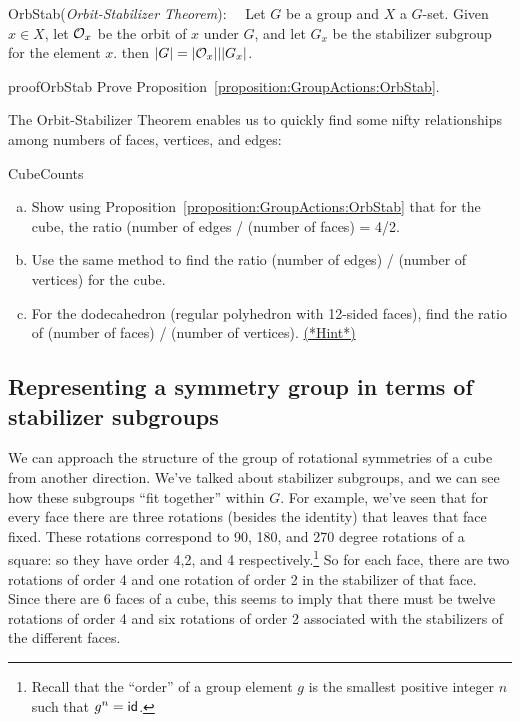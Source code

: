 \begin{prop}{OrbStab}(\emph{Orbit-Stabilizer Theorem}):~~
Let $G$ be a group and $X$ a $G$-set. Given $x\in X$, let ${\cal O}_x$ be the orbit of $x$ under $G$, and let $G_x$ be the stabilizer subgroup for the element $x$. then $|G| = |{\cal O}_x|||G_x|$. 
\end{prop}

\begin{exercise}{proofOrbStab}
Prove Proposition~\ref{proposition:GroupActions:OrbStab}.
\end{exercise}


The Orbit-Stabilizer Theorem enables us to quickly find some nifty relationships among numbers of faces, vertices, and edges:

\begin{exercise}{CubeCounts}
\begin{enumerate}[(a)]
\item
Show using Proposition~\ref{proposition:GroupActions:OrbStab} that for the cube, the ratio (number of edges / (number of  faces) = 4/2. 
\item Use the same method to find the ratio (number of edges) / (number of vertices) for the cube.
\item For the dodecahedron (regular polyhedron with 12-sided faces), find the ratio of (number of faces) / (number of vertices).
\hyperref[sec:GroupActions:Hints]{(*Hint*)}
\end{enumerate}
\end{exercise} 

\subsection{Representing a symmetry group in terms of stabilizer subgroups}
\label{subsec:GroupActions:SymmetryOfPolyhedra:RepresentSymmetryGroupAsStabilizer}

We can approach the structure of the group of rotational symmetries of a cube from another direction.  We've talked about stabilizer subgroups, and we can see how these subgroups ``fit together'' within $G$.
For example, we've seen that for every face there are three rotations (besides the identity) that leaves that face fixed. These rotations correspond to 90, 180, and 270 degree rotations of a square: so they have order 4,2, and 4 respectively.\footnote{Recall that the ``order'' of a group element $g$ is the smallest positive integer $n$ such that $g^n = \sf{id}$.} So for each face, there are two rotations of order 4 and one rotation of order 2 in the stabilizer of that face. Since there are 6 faces of a cube, this seems to imply that there must be twelve rotations of order 4 and six rotations of order 2 associated with the stabilizers of the different faces.  

